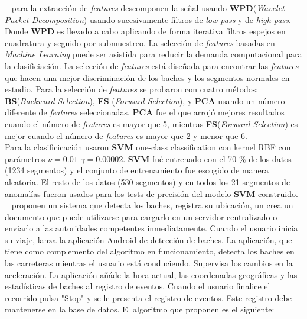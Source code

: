 		~ para la extracción de \emph{features} descomponen la señal usando \textbf{WPD}(\emph{Wavelet Packet Decomposition})
		usando sucesivamente filtros de \emph{low-pass} y de \emph{high-pass}. Donde \textbf{WPD} es llevado a cabo aplicando de forma iterativa filtros
		espejos en cuadratura y seguido por submuestreo. La selección de \emph{features} basadas en \emph{Machine Learning} puede ser asistida para
		reducir la demanda computacional para la clasificiación. La selección de \emph{features} está diseñada para encontrar las \emph{features} que
		hacen una mejor discriminación de los baches y los segmentos normales en estudio. Para la selección de \emph{features} se probaron con cuatro
		métodos: \textbf{BS}(\emph{Backward Selection}), \textbf{FS} (\emph{Forward Selection}),  y \textbf{PCA} usando un número diferente de \emph
		{features} seleccionadas. \textbf{PCA} fue el que arrojó mejores resultados cuando el número de \emph{features} es mayor que 5, mientras \textbf
		{FS}(\emph{Forward Selection}) es mejor cuando el número de \emph{features} es mayor que 2 y menor que 6.\\
		Para la clasificicación usaron \textbf{SVM} one-class classification con kernel RBF con parámetros  $\nu = 0.01$  $\gamma = 0.00002$. \textbf
		{SVM} fué entrenado con el 70 \%  de los datos (1234 segmentos) y el conjunto de entrenamiento fue escogido de manera aleatoria. El resto de
		los datos  (530 segmentos) y en todos los 21 segmentos de anomalías fueron usados para los tests de precisión del modelo \textbf{SVM} construido.\\

		~ proponen un sistema que detecta los baches, registra su ubicación, un crea un documento que puede utilizarse
		para cargarlo en un servidor centralizado o enviarlo  a las autoridades competentes inmediatamente.  Cuando el usuario inicia su viaje, lanza
		la aplicación Android de detección de baches. La aplicación, que tiene como complemento del algoritmo en funcionamiento, detecta los baches en
		las carreteras mientras el usuario está conduciendo. Supervisa los cambios en la aceleración. La aplicación añáde la hora actual, las coordenadas
		geográficas y las estadísticas de baches al registro de eventos. Cuando el usuario  finalice el recorrido pulsa "Stop"  y se le presenta el
		registro de eventos. Este registro debe mantenerse en la base de datos.  El algoritmo que proponen es el siguiente:\\\\
		\noindent

